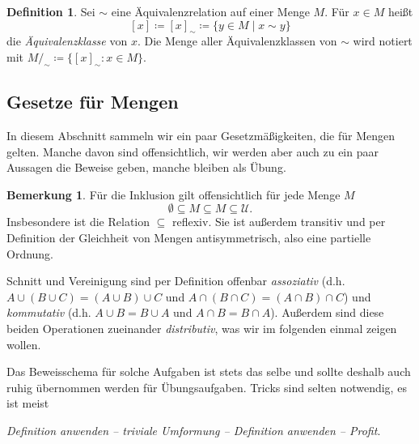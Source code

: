 \documentclass[11pt, a4paper]{article}
\theoremstyle{definition}
\newtheorem{definition}{Definition}[section]
\newtheorem*{remark*}{Bemerkung}
\theoremstyle{plain}
\numberwithin{equation}{section}
\begin{document}
\begin{definition}
	Sei \( \sim \) eine Äquivalenzrelation auf einer Menge \( M \). Für \( x \in M \) heißt
	\[
		[x] \coloneqq [x]_\sim \coloneqq \{ y \in M \mid x \sim y \}
	\]
	die \textit{Äquivalenzklasse} von \( x \). Die Menge aller Äquivalenzklassen von \( \sim \) wird notiert mit \( M /_\sim \coloneqq \{ [x]_\sim : x \in M \} \).
\end{definition}



\subsection{Gesetze für Mengen}\label{sec:pre_setlaws}
In diesem Abschnitt sammeln wir ein paar Gesetzmäßigkeiten, die für Mengen gelten. Manche davon sind offensichtlich, wir werden aber auch zu ein paar Aussagen die Beweise geben, manche bleiben als Übung.
\begin{remark*}
	Für die Inklusion gilt offensichtlich für jede Menge \( M \)
	\[
		\emptyset \subseteq M \subseteq M \subseteq \mathcal{U}.
	\]
	Insbesondere ist die Relation \( \subseteq \) reflexiv. Sie ist außerdem transitiv und per Definition der Gleichheit von Mengen antisymmetrisch, also eine partielle Ordnung.\par
	Schnitt und Vereinigung sind per Definition offenbar \textit{assoziativ} (d.h. \( A \cup (B \cup C) = (A \cup B) \cup C \) und \( A \cap (B \cap C) = (A \cap B) \cap C \)) und \textit{kommutativ} (d.h. \( A \cup B = B \cup A \) und \( A \cap B = B \cap A \)). Außerdem sind diese beiden Operationen zueinander \textit{distributiv}, was wir im folgenden einmal zeigen wollen. 
\end{remark*}
Das Beweisschema für solche Aufgaben ist stets das selbe und sollte deshalb auch ruhig übernommen werden für Übungsaufgaben. Tricks sind selten notwendig, es ist meist
\begin{center}
	\textit{Definition anwenden -- triviale Umformung -- Definition anwenden -- Profit}.
\end{center}
\end{document}
